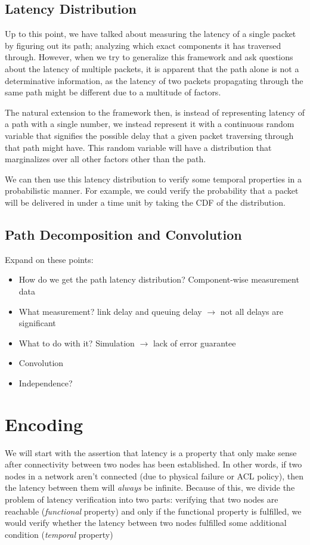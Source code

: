 \documentclass[10pt,sigconf,letterpaper,anonymous,nonacm]{acmart}
\begin{document}
\subsection{Latency Distribution}
Up to this point, we have talked about measuring the latency of a single packet by figuring out 
its path; analyzing which exact components it has traversed through.
However, when we try to generalize this framework and ask questions about the latency of multiple 
packets, it is apparent that the path alone is not a determinative information, as the latency 
of two packets propagating through the same path might be different due to a multitude of factors.

The natural extension to the framework then, is instead of representing latency of a path with a 
single number, we instead represent it with a continuous random variable that signifies the 
possible delay that a given packet traversing through that path might have.
This random variable will have a distribution that marginalizes over all other factors other than 
the path.

We can then use this latency distribution to verify some temporal properties in a probabilistic 
manner.
For example, we could verify the probability that a packet will be delivered in under a time 
unit by taking the CDF of the distribution.

\subsection{Path Decomposition and Convolution}
Expand on these points:
\begin{itemize}
    \item How do we get the path latency distribution? Component-wise measurement data
    \item What measurement? link delay and queuing delay $\rightarrow$ not all delays are 
    significant
    \item What to do with it? Simulation $\rightarrow$ lack of error guarantee
    \item Convolution
    \item Independence?
\end{itemize}



\section{Encoding}
We will start with the assertion that latency is a property that only make sense 
after connectivity between two nodes has been established. 
In other words, if two nodes in a network aren't connected (due to physical failure 
or ACL policy), then the latency between them will \textit{always} be infinite.
Because of this, we divide the problem of latency verification into two parts: 
verifying that two nodes are reachable (\textit{functional} property) and only if 
the functional property is fulfilled, we would verify whether the latency between 
two nodes fulfilled some additional condition (\textit{temporal} property)
\end{document}
